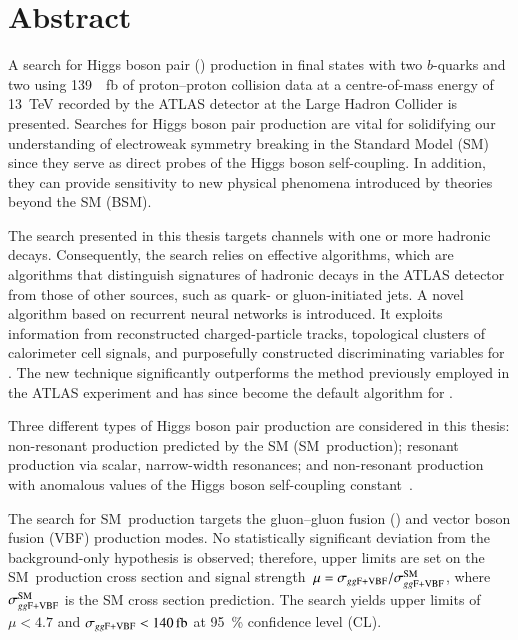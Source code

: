 \chapter*{Abstract}

A search for Higgs boson pair (\HH) production in final states with two
$b$-quarks and two \tauleptons using \SI{139}{\per\femto\barn} of proton--proton
collision data at a centre-of-mass energy of \SI{13}{\TeV} recorded by the ATLAS
detector at the Large Hadron Collider is presented. Searches for Higgs boson
pair production are vital for solidifying our understanding of electroweak
symmetry breaking in the Standard Model (SM) since they serve as direct probes
of the Higgs boson self-coupling. In addition, they can provide sensitivity to
new physical phenomena introduced by theories beyond the SM (BSM).

The search presented in this thesis targets channels with one or more hadronic
\taulepton decays. Consequently, the search relies on effective \tauid
algorithms, which are algorithms that distinguish signatures of hadronic
\taulepton decays in the ATLAS detector from those of other sources, such as
quark- or gluon-initiated jets. A novel \tauid algorithm based on recurrent
neural networks is introduced. It exploits information from reconstructed
charged-particle tracks, topological clusters of calorimeter cell signals, and
purposefully constructed discriminating variables for \tauid. The new technique
significantly outperforms the method previously employed in the ATLAS experiment
and has since become the default algorithm for \tauid.

Three different types of Higgs boson pair production are considered in this
thesis: non-resonant \HH production predicted by the SM (SM~\HH production);
resonant \HH production via scalar, narrow-width resonances; and non-resonant
\HH production with anomalous values of the Higgs boson self-coupling
constant~\lambdahhh.

The search for SM~\HH production targets the gluon--gluon fusion (\ggF) and
vector boson fusion (VBF) production modes. No statistically significant
deviation from the background-only hypothesis is observed; therefore, upper
limits are set on the SM~\HH production cross section \xsecggfvbf and signal
strength~$\mu = \sigma_{gg\text{F+VBF}} / \sigma_{gg\text{F+VBF}}^{\text{SM}}$, where
$\sigma_{gg\text{F+VBF}}^{\text{SM}}$ is the SM cross section prediction. The search yields
upper limits of $\mu < \num{4.7}$ and $\xsecggfvbf < \SI{140}{\femto\barn}$ at
\SI{95}{\percent} confidence level (CL).

